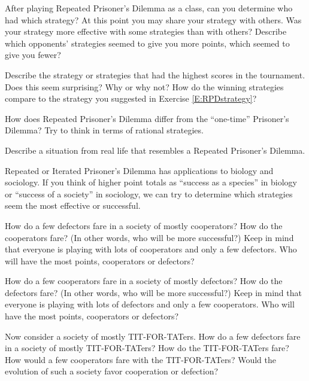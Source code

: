\begin{xca}\label{E:RPDeffectivestrategies}
After playing Repeated Prisoner's Dilemma as a class, can you determine who had which strategy? At this point you may share your strategy with others. Was your strategy more effective with some strategies than with others? Describe which opponents' strategies seemed to give you more points, which seemed to give you fewer?
\end{xca}

\begin{xca}\label{E:RPDbeststrategies}
Describe the strategy or strategies that had the highest scores in the tournament. Does this seem surprising? Why or why not? How do the winning strategies compare to the strategy you suggested in Exercise \ref{E:RPDstrategy}?
\end{xca}

\begin{xca}\label{E:RPDcompare}
How does Repeated Prisoner's Dilemma differ from the ``one-time'' Prisoner's Dilemma? Try to think in terms of rational strategies.
\end{xca}

\begin{xca}\label{E:RPDreallife}
Describe a situation from real life that resembles a Repeated Prisoner's Dilemma. 
\end{xca}

Repeated or Iterated Prisoner's Dilemma has applications to biology and sociology. If you think of higher point totals as ``success as a species'' in biology or ``success of a society'' in sociology, we can try to determine which strategies seem the most effective or successful.


\begin{xca}\label{E:RPDfewdefect}
How do a few defectors fare in a society of mostly cooperators? How do the cooperators fare?  (In other words, who will be more successful?) Keep in mind that everyone is playing with lots of cooperators and only a few defectors. Who will have the most points, cooperators or defectors?
\end{xca}

\begin{xca}\label{E:RPDfewcoop} 
How do a few cooperators fare in a society of mostly defectors? How do the defectors fare? (In other words, who will be more successful?) Keep in mind that everyone is playing with lots of defectors and only a few cooperators. Who will have the most points, cooperators or defectors?
\end{xca}

\begin{xca}\label{E:RPDtft}
Now consider a society of mostly TIT-FOR-TATers. How do a few defectors fare in a society of mostly TIT-FOR-TATers? How do the TIT-FOR-TATers fare? How would a few cooperators fare with the TIT-FOR-TATers? Would the evolution of such a society favor cooperation or defection?
\end{xca}





 